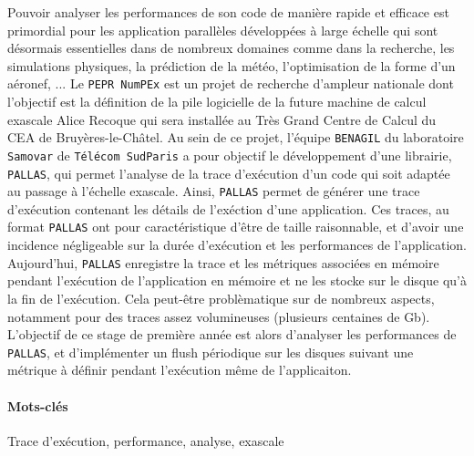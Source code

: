 

Pouvoir analyser les performances de son code de manière rapide et efficace est primordial pour les application parallèles développées à large échelle qui sont désormais essentielles dans de nombreux domaines comme dans la recherche, les simulations physiques, la prédiction de la météo, l'optimisation de la forme d'un aéronef, ... \newline
Le \verb!PEPR NumPEx! est un projet de recherche d'ampleur nationale dont l'objectif est la définition de la pile logicielle de la future machine de calcul exascale Alice Recoque qui sera installée au Très Grand Centre de Calcul du CEA de Bruyères-le-Châtel. Au sein de ce projet, l'équipe \verb!BENAGIL! du laboratoire \verb!Samovar! de \verb!Télécom SudParis! 
a pour objectif le développement d'une librairie, \verb!PALLAS!, qui permet l'analyse de la trace d'exécution d'un code qui soit adaptée au passage à l'échelle exascale. Ainsi, \verb!PALLAS! permet de générer une trace d'exécution contenant les détails de l'exéction d'une application. Ces traces, au format \verb!PALLAS! ont pour caractéristique d'être de taille raisonnable, 
et d'avoir une incidence négligeable sur la durée d'exécution et les performances de l'application.\newline
Aujourd'hui, \verb!PALLAS! enregistre la trace et les métriques associées en mémoire pendant l'exécution de l'application en mémoire et ne les stocke sur le disque qu'à la fin de l'exécution. Cela peut-être problèmatique sur de nombreux aspects, notamment pour des traces assez volumineuses (plusieurs centaines de Gb).
L'objectif de ce stage de première année est alors d'analyser les performances de \verb!PALLAS!, et d'implémenter un flush périodique sur les disques suivant une métrique à définir pendant l'exécution même de l'applicaiton.



\paragraph*{Mots-clés}\label{par:mots-cles}


Trace d'exécution, performance, analyse, exascale
